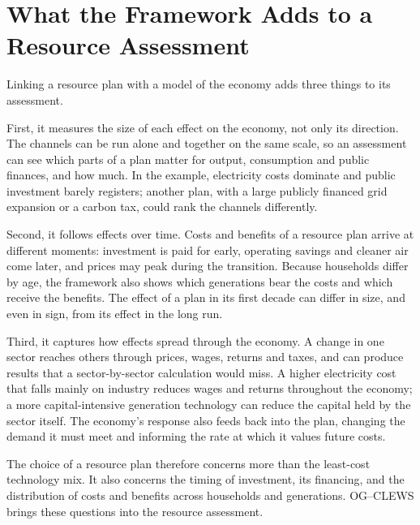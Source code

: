 \section{What the Framework Adds to a Resource Assessment}
\label{sec:implications}

Linking a resource plan with a model of the economy adds three things to its assessment.

First, it measures the size of each effect on the economy, not only its direction. The
channels can be run alone and together on the same scale, so an assessment can see which
parts of a plan matter for output, consumption and public finances, and how much. In the
example, electricity costs dominate and public investment barely registers; another plan,
with a large publicly financed grid expansion or a carbon tax, could rank the channels
differently.

Second, it follows effects over time. Costs and benefits of a resource plan arrive at
different moments: investment is paid for early, operating savings and cleaner air come
later, and prices may peak during the transition. Because households differ by age, the
framework also shows which generations bear the costs and which receive the benefits.
The effect of a plan in its first decade can differ in size, and even in sign, from its
effect in the long run.

Third, it captures how effects spread through the economy. A change in one sector reaches
others through prices, wages, returns and taxes, and can produce results that a
sector-by-sector calculation would miss. A higher electricity cost that falls mainly on
industry reduces wages and returns throughout the economy; a more capital-intensive
generation technology can reduce the capital held by the sector itself. The economy's
response also feeds back into the plan, changing the demand it must meet and informing
the rate at which it values future costs.

The choice of a resource plan therefore concerns more than the least-cost technology mix. It
also concerns the timing of investment, its financing, and the distribution of costs and
benefits across households and generations. OG--CLEWS brings these questions into the
resource assessment.
